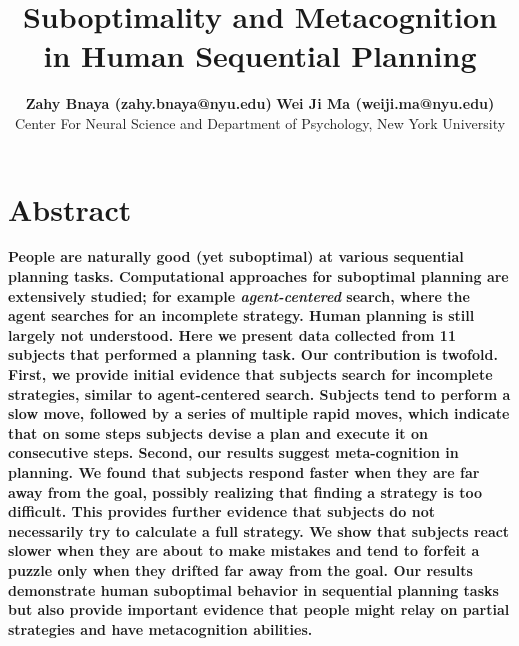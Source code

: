 \documentclass[10pt,letterpaper]{article}
\title{Suboptimality and Metacognition in Human Sequential Planning}
\author{{\large \bf Zahy Bnaya (zahy.bnaya@nyu.edu)} {\large \bf Wei Ji Ma (weiji.ma@nyu.edu)} \\
Center For Neural Science and Department of Psychology, New York University\\
}
\begin{document}
\vspace{-0.5cm}
\maketitle
\vspace{-0.5cm}

\section{Abstract}

{\bf
\vspace{-0.1cm}
People are naturally good (yet suboptimal) at various sequential planning tasks. Computational approaches for suboptimal planning are extensively studied; for example \emph{agent-centered} search, where the agent searches for an incomplete strategy. Human planning is still largely not understood. Here we present data collected from 11 subjects that performed a planning task. Our contribution is twofold. First, we provide initial evidence that subjects search for incomplete strategies, similar to agent-centered search. Subjects tend to perform a slow move, followed by a series of multiple rapid moves, which indicate that on some steps subjects devise a plan and execute it on consecutive steps. 
Second, our results suggest meta-cognition in planning. We found that subjects respond faster when they are far away from the goal, possibly realizing that finding a strategy is too difficult. This provides further evidence that subjects do not necessarily try to calculate a full strategy. We show that subjects react slower when they are about to make mistakes and tend to forfeit a puzzle only when they drifted far away from the goal. Our results demonstrate human suboptimal behavior in sequential planning tasks but also provide important evidence that people might relay on partial strategies and have metacognition abilities.


}
\end{document}
